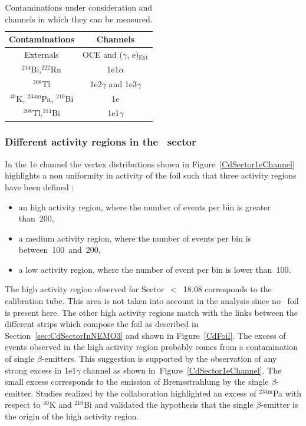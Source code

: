\documentclass[main.tex]{subfiles}
\begin{document}
\begin{table}[h!]
\centering
\begin{tabular}{c|c}
\toprule
Contaminations & Channels \\[0.1cm]
\hline
Externals                                              & OCE and ($\gamma$, e)$_{\text{Ext}}$  \\[0.1cm]
$^{\text{214}}$Bi,$^{\text{222}}$Rn                    & 1e1$\alpha$                           \\[0.1cm]  
$^{\text{208}}$Tl                                      & 1e2$\gamma$  and 1e3$\gamma$          \\[0.1cm]
$^{\text{40}}$K, $^{\text{234m}}$Pa, $^{\text{210}}$Bi & 1e                                    \\[0.1cm]
$^{\text{208}}$Tl,$^{\text{214}}$Bi                    & 1e1$\gamma$                           \\[0.1cm] 
\bottomrule
\end{tabular}
\caption{Contaminations under consideration and channels in which they can be measured.}
\label{TableChannelBKG}
\end{table}


\bigskip


\subsubsection{Different activity regions in the \Cd~sector}

\NI In the 1e channel the vertex distributions shown in Figure~\ref{CdSector1eChannel} highlights a non uniformity in activity of the foil such that three activity regions have been defined : 


\begin{itemize}
\item an high activity region, where the number of events per bin is greater than~200,
\item a medium activity region, where the number of events per bin is between~100~and~200,
\item a low activity region, where the number of event per bin is lower than~100.

\end{itemize}


\NI The high activity region observed for Sector~$<$~18.08 corresponds to the calibration tube. This area is not taken into account in the analysis since no \Cd~foil is present here. The other high activity regions match with the links between the different strips which compose the foil as described in Section~\ref{sec:CdSectorInNEMO3} and shown in Figure~\ref{CdFoil}. The excess of events observed in the high activity region probably comes from a contamination of single $\beta$-emitters. This suggestion is supported by the observation of any strong excess in 1e1$\gamma$ channel as shown in~Figure~\ref{CdSector1eChannel}. The small excess corresponds to the emission of Bremsstrahlung by the single $\beta$-emitter. Studies realized by the collaboration highlighted an excess of $^{\text{234m}}$Pa with respect to $^{\text{40}}$K and $^{\text{210}}$Bi and validated the hypothesis that the single $\beta$-emitter is the origin of the high activity region.
\end{document}
